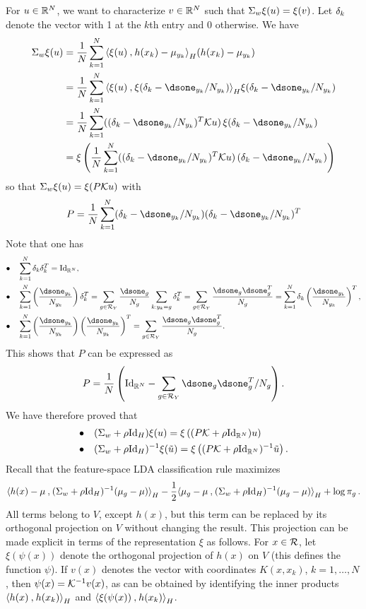 For $u\in {\mathbb{R}}^N$, we want to characterize $v\in {\mathbb{R}}^N$ such that $\Sigma_w \xi(u) = \xi(v)$. Let $\delta_k$ denote the vector with 1 at the $k$th entry and 0 otherwise. We have
\begin{align*}
\Sig_w \xi(u) &= \frac1N \sum_{k=1}^N  \scp{\xi(u)}{h(x_k) - \mu_{y_k}}_H (h(x_k) - \mu_{y_k})\\
&= \frac1N \sum_{k=1}^N  \scp{\xi(u)}{\xi(\de_k - \dsone_{y_k}/N_{y_k})}_H \xi(\de_k - \dsone_{y_k}/N_{y_k})\\
&= \frac1N \sum_{k=1}^N  ((\de_k - \dsone_{y_k}/N_{y_k})^T \CK u)\, \xi(\de_k - \dsone_{y_k}/N_{y_k})\\
&= \xi\left( \frac1N \sum_{k=1}^N  ((\de_k - \dsone_{y_k}/N_{y_k})^T \CK u)\, (\de_k - \dsone_{y_k}/N_{y_k})\right)
\end{align*}
so that $\Sigma_w \xi(u) = \xi(P{\mathcal K} u)$ with
\[
P = \frac1N \sum_{k=1}^N  (\de_k - \dsone_{y_k}/N_{y_k})(\de_k - \dsone_{y_k}/N_{y_k})^T
\]
Note that one has
\begin{align*}
\bullet\quad & \sum_{k=1}^N  \de_k \de_k^T = \Id[N],\\ 
\bullet\quad&
\sum_{k=1}^N \left(\frac{\dsone_{y_k}}{N_{y_k}}\right) \de_k^T = \sum_{g\in\CR_Y} \frac{\dsone_{g}}{N_{g}} \sum_{k: y_k=g} \de_k^T = \sum_{g\in\CR_Y} \frac{\dsone_{g}\dsone_{g}^T}{N_{g}} = \sum_{k=1}^N \de_k \left(\frac{\dsone_{y_k}}{N_{y_k}}\right)^T,\\
\bullet\quad&
\sum_{k=1}^N \left(\frac{\dsone_{y_k}}{N_{y_k}}\right) \left(\frac{\dsone_{y_k}}{N_{y_k}}\right)^T = \sum_{g\in\CR_Y} \frac{\dsone_{g}\dsone_{g}^T}{N_{g}}.
\end{align*}
This shows that $P$ can be expressed as
\[
P =\frac1N \left( \Id[N] - \sum_{g\in\CR_Y} \dsone_{g}\dsone_{g}^T/N_g\right).
\] 
We have therefore proved that 
\[
\begin{aligned}
\bullet\quad & (\Sig_w + \rho\Id_H) \xi(u) = \xi\left((P\CK + \rho\Id[N]) u\right)\\
\bullet\quad & (\Sig_w + \rho\Id_H)^{-1} \xi(\tilde u) = \xi\left((P\CK + \rho\Id[N])^{-1} \tilde u \right).
\end{aligned}
\]
 Recall that the feature-space LDA classification rule maximizes
\[
\scp{h(x)-\mu}{ (\Sig_w + \rho\Id_H)^{-1} (\mu_g -  \mu)}_H 
- \frac12 \scp{\mu_g -  \mu}{(\Sig_w + \rho\Id_H)^{-1} (\mu_g-  \mu)}_H + \log\pi_g\,.
\]
 All terms belong to $V$, except $h(x)$, but this term can be replaced by its orthogonal projection on $V$ without changing the result. This projection can be made explicit in terms of the representation $\xi$ as follows. 
For $x\in {\mathcal R}$, let $\xi(\psi(x))$ denote the orthogonal projection of $h(x)$ on $V$ (this defines the function $\psi$). If $v(x)$ denotes the vector with coordinates $K(x, x_k)$, $k=1, \ldots, N$, then $\psi(x) = {\mathcal K}^{-1} v(x)$, as can be obtained by identifying the inner products ${\langle {h(x)}\mathbin{,} {h(x_k)}\rangle}_H$ and ${\langle {\xi(\psi(x))}\mathbin{,} {h(x_k)}\rangle}_H$.

